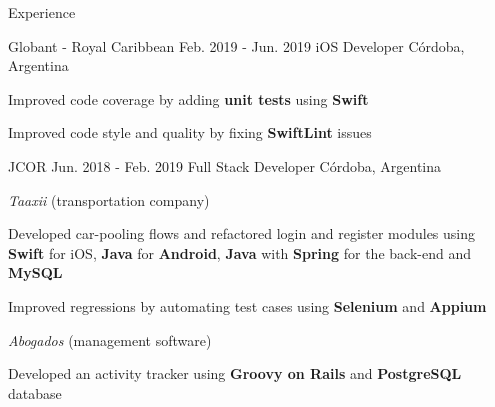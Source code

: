 \documentclass{curriculum}
\begin{document}
\begin{cvsection}{Experience}
\begin{sectionitemlist}
        \end{sectionitemlist}


    \makesectionitemheader
        {Globant - Royal Caribbean}               {Feb. 2019 - Jun. 2019}
        {iOS Developer}                           {Córdoba, Argentina}
        \begin{sectionitemlist}
        \item{Improved code coverage by adding \textbf{unit tests} using \textbf{Swift}}
        \item{Improved code style and quality by fixing \textbf{SwiftLint} issues}
        \end{sectionitemlist}


    \makesectionitemheader
        {JCOR}                                    {Jun. 2018 - Feb. 2019}
        {Full Stack Developer}                    {Córdoba, Argentina}
        \begin{sectionitemlist}
        \item{\textit{Taaxii} (transportation company)}
            \begin{sectionitemlist}
            \item{Developed car-pooling flows and refactored login and register modules using \textbf{Swift} for iOS, \textbf{Java} for \textbf{Android}, \textbf{Java} with \textbf{Spring} for the back-end and \textbf{MySQL}}
            \item{Improved regressions by automating test cases using \textbf{Selenium} and \textbf{Appium}}
            \end{sectionitemlist}
        \item{\textit{Abogados} (management software)}
            \begin{sectionitemlist}
            \item{Developed an activity tracker using \textbf{Groovy on Rails} and \textbf{PostgreSQL} database}
            \end{sectionitemlist}
        \end{sectionitemlist}


\end{cvsection}
\end{document}
